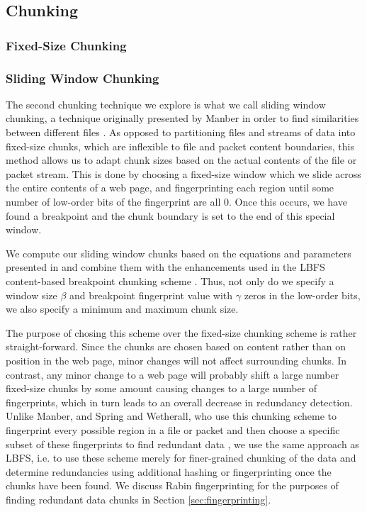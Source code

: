 \subsection{Chunking}
\label{sec:chunking}
\subsubsection{Fixed-Size Chunking}

\subsubsection{Sliding Window Chunking}
The second chunking technique we explore is what we call sliding window chunking, a technique originally presented by Manber in order to find similarities between different files \cite{manber}. As opposed to partitioning files and streams of data into fixed-size chunks, which are inflexible to file and packet content boundaries, this method allows us to adapt chunk sizes based on the actual contents of the file or packet stream. This is done by choosing a fixed-size window which we slide across the entire contents of a web page, and fingerprinting each region until some number of low-order bits of the fingerprint are all 0. Once this occurs, we have found a breakpoint and the chunk boundary is set to the end of this special window. 

We compute our sliding window chunks based on the equations and parameters presented in \cite{spring} and combine them with the enhancements used in the LBFS content-based breakpoint chunking scheme \cite{lbfs}. Thus, not only do we specify a window size $\beta$ and breakpoint fingerprint value with $\gamma$ zeros in the low-order bits, we also specify a minimum and maximum chunk size. 

The purpose of chosing this scheme over the fixed-size chunking scheme is rather straight-forward. Since the chunks are chosen based on content rather than on position in the web page, minor changes will not affect surrounding chunks. In contrast, any minor change to a web page will probably shift a large number fixed-size chunks by some amount causing changes to a large number of fingerprints, which in turn leads to an overall decrease in redundancy detection. Unlike Manber, and Spring and Wetherall, who use this chunking scheme to fingerprint every possible region in a file or packet and then choose a specific subset of these fingerprints to find redundant data \cite{manber,spring}, we use the same approach as LBFS, i.e. to use these scheme merely for finer-grained chunking of the data and determine redundancies using additional hashing or fingerprinting once the chunks have been found. We discuss Rabin fingerprinting for the purposes of finding redundant data chunks in Section \ref{sec:fingerprinting}. 


